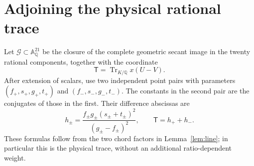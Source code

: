 \documentclass[11pt,a4paper]{article}
\newcommand{\Q}{\mathbb Q}\newcommand{\Z}{\mathbb Z}
\newcommand{\A}{\mathbb A}\newcommand{\calV}{\mathcal V}
\DeclareMathOperator{\Tr}{Tr}\DeclareMathOperator{\Res}{Res}
\begin{document}
\section{Adjoining the physical rational trace}
Let $\mathcal G\subset\A_\Q^{21}$ be the closure of the complete
geometric secant image in the twenty rational components, together
with the coordinate
\[
                         \mathsf T=\Tr_{K/\Q}x(U-V).
\]
After extension of scalars, use two independent point pairs with
parameters $(f_+,s_+,g_+,t_+)$ and $(f_-,s_-,g_-,t_-)$.
The constants in the second pair are the conjugates of those in
the first. Their difference abscissas are
\begin{equation}\label{eq:splitheight}
 h_\pm=\frac{f_\pm g_\pm(s_\pm+t_\pm)^2}
                     {(g_\pm-f_\pm)^2},\qquad
                         \mathsf T=h_++h_-.
\end{equation}
These formulas follow from the two chord factors in
Lemma~\ref{lem:line}; in particular this is the physical trace,
without an additional ratio-dependent weight.
\end{document}
